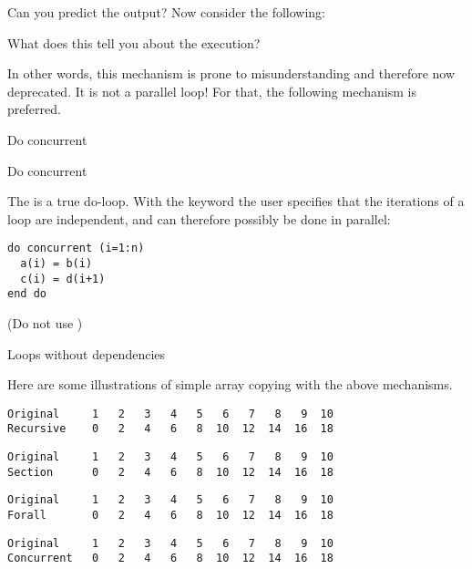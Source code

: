 \begin{multicols}{2}
  \columnbreak
\end{multicols}

Can you predict the output? Now consider the following:


What does this tell you about the execution?

In other words, this mechanism is prone to misunderstanding and therefore now
deprecated.
It is not a parallel loop! For that, the following mechanism is preferred.

 {Do concurrent}

\begin{block}{Do concurrent}
  \label{sl:farray-concurrent}

  The  is a true do-loop. With the
   keyword the user specifies that the
  iterations of a loop are independent, and can therefore possibly be
  done in parallel:
\begin{lstlisting}
do concurrent (i=1:n)
  a(i) = b(i)
  c(i) = d(i+1)
end do
\end{lstlisting}
(Do not use )
\end{block}

 {Loops without dependencies}

Here are some illustrations of simple array copying with the above
mechanisms.

\begin{lstlisting}
Original     1   2   3   4   5   6   7   8   9  10
Recursive    0   2   4   6   8  10  12  14  16  18
\end{lstlisting}

\begin{lstlisting}
Original     1   2   3   4   5   6   7   8   9  10
Section      0   2   4   6   8  10  12  14  16  18
\end{lstlisting}

\begin{lstlisting}
Original     1   2   3   4   5   6   7   8   9  10
Forall       0   2   4   6   8  10  12  14  16  18
\end{lstlisting}

\begin{lstlisting}
Original     1   2   3   4   5   6   7   8   9  10
Concurrent   0   2   4   6   8  10  12  14  16  18
\end{lstlisting}


